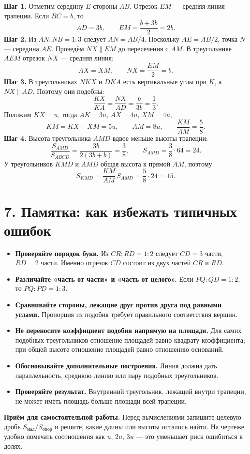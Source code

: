 \documentclass[a4paper,12pt]{article}
\newcommand{\key}[1]{\textcolor{darkaccent}{\textbf{#1}}}
\newcommand{\smallrule}{\par\vspace{1mm}\noindent{\color{accent}\rule{\linewidth}{.45pt}}\par\vspace{1mm}}
\begin{document}
\textbf{Шаг 1.} Отметим середину $E$ стороны $AB$. Отрезок $EM$ --- средняя линия трапеции. Если $BC=b$, то
\[
AD=3b,\qquad EM=\frac{b+3b}{2}=2b.
\]
\textbf{Шаг 2.} Из $AN:NB=1:3$ следует $AN=AB/4$. Поскольку $AE=AB/2$, точка $N$ --- середина $AE$. Проведём $NX\parallel EM$ до пересечения с $AM$. В треугольнике $AEM$ отрезок $NX$ --- средняя линия:
\[
AX=XM,\qquad NX=\frac{EM}{2}=b.
\]
\textbf{Шаг 3.} В треугольниках $NKX$ и $DKA$ есть вертикальные углы при $K$, а $NX\parallel AD$. Поэтому они подобны:
\[
\frac{KX}{KA}=\frac{NX}{AD}=\frac{b}{3b}=\frac13.
\]
Положим $KX=u$, тогда $AK=3u$, $AX=4u$, $XM=4u$,
\[
KM=KX+XM=5u,\qquad AM=8u,\qquad\boxed{\frac{KM}{AM}=\frac58}.
\]
\textbf{Шаг 4.} Высота треугольника $AMD$ вдвое меньше высоты трапеции:
\[
\frac{S_{AMD}}{S_{ABCD}}=\frac{3b}{2(3b+b)}=\frac38,
\qquad S_{AMD}=\frac38\cdot64=24.
\]
У треугольников $KMD$ и $AMD$ общая высота к прямой $AM$, поэтому
\[
\boxed{S_{KMD}=\frac{KM}{AM}\,S_{AMD}=\frac58\cdot24=15}.
\]
\clearpage

\section*{7. Памятка: как избежать типичных ошибок}
\begin{itemize}
\item \key{Проверяйте порядок букв.} Из $CR:RD=1:2$ следует $CD=3$ части, $RD=2$ части. Именно отрезок $CD$ состоит из двух частей $CR$ и $RD$.
\item \key{Различайте «часть от части» и «часть от целого».} Если $PQ:QD=1:2$, то $PQ:PD=1:3$.
\item \key{Сравнивайте стороны, лежащие друг против друга под равными углами.} Пропорция из подобия требует правильного соответствия вершин.
\item \key{Не переносите коэффициент подобия напрямую на площади.} Для самих подобных треугольников отношение площадей равно квадрату коэффициента; при общей высоте отношение площадей равно отношению оснований.
\item \key{Обосновывайте дополнительные построения.} Линия должна дать параллельность, среднюю линию или пару подобных треугольников.
\item \key{Проверяйте результат.} Внутренний треугольник, лежащий внутри трапеции, не может иметь площадь больше площади всей трапеции.
\end{itemize}
\smallrule
\textbf{Приём для самостоятельной работы.} Перед вычислениями запишите целевую дробь $S_{\text{мал}}/S_{\text{опор}}$ и решите, какие длины или высоты осталось найти. На чертеже удобно помечать соотношения как $u$, $2u$, $3u$ --- это уменьшает риск ошибиться в долях.
\end{document}
